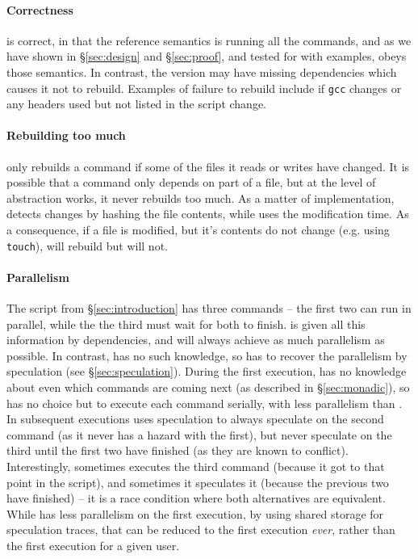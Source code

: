 \paragraph{Correctness} \Rattle is correct, in that the reference semantics is running all the commands, and as we have shown in \S\ref{sec:design} and \S\ref{sec:proof}, and tested for with examples, \Rattle obeys those semantics. In contrast, the \Make version may have missing dependencies which causes it not to rebuild. Examples of failure to rebuild include if \texttt{gcc} changes or any headers used but not listed in the \Make script change.

\paragraph{Rebuilding too much} \Rattle only rebuilds a command if some of the files it reads or writes have changed. It is possible that a command only depends on part of a file, but at the level of abstraction \Rattle works, it never rebuilds too much. As a matter of implementation, \Rattle detects changes by hashing the file contents, while \Make uses the modification time. As a consequence, if a file is modified, but it's contents do not change (e.g. using \texttt{touch}), \Make will rebuild but \Rattle will not.

\paragraph{Parallelism} The script from \S\ref{sec:introduction} has three commands -- the first two can run in parallel, while the the third must wait for both to finish. \Make is given all this information by dependencies, and will always achieve as much parallelism as possible. In contrast, \Rattle has no such knowledge, so has to recover the parallelism by speculation (see \S\ref{sec:speculation}). During the first execution, \Rattle has no knowledge about even which commands are coming next (as described in \S\ref{sec:monadic}), so has no choice but to execute each command serially, with less parallelism than \Make. In subsequent executions \Rattle uses speculation to always speculate on the second command (as it never has a hazard with the first), but never speculate on the third until the first two have finished (as they are known to conflict). Interestingly, sometimes \Rattle executes the third command (because it got to that point in the script), and sometimes it speculates it (because the previous two have finished) -- it is a race condition where both alternatives are equivalent. While \Rattle has less parallelism on the first execution, by using shared storage for speculation traces, that can be reduced to the first execution \emph{ever}, rather than the first execution for a given user.

